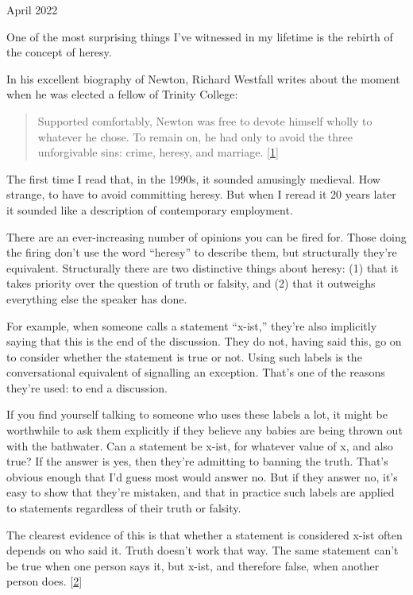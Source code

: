 April 2022

One of the most surprising things I've witnessed in my lifetime is the
rebirth of the concept of heresy.

In his excellent biography of Newton, Richard Westfall writes about the
moment when he was elected a fellow of Trinity College:

\begin{quote}
Supported comfortably, Newton was free to devote himself wholly to
whatever he chose. To remain on, he had only to avoid the three
unforgivable sins: crime, heresy, and marriage. {[}\hyperref[f1n]{1}{]}
\end{quote}

The first time I read that, in the 1990s, it sounded amusingly medieval.
How strange, to have to avoid committing heresy. But when I reread it 20
years later it sounded like a description of contemporary employment.

There are an ever-increasing number of opinions you can be fired for.
Those doing the firing don't use the word ``heresy'' to describe them,
but structurally they're equivalent. Structurally there are two
distinctive things about heresy: (1) that it takes priority over the
question of truth or falsity, and (2) that it outweighs everything else
the speaker has done.

For example, when someone calls a statement ``x-ist,'' they're also
implicitly saying that this is the end of the discussion. They do not,
having said this, go on to consider whether the statement is true or
not. Using such labels is the conversational equivalent of signalling an
exception. That's one of the reasons they're used: to end a discussion.

If you find yourself talking to someone who uses these labels a lot, it
might be worthwhile to ask them explicitly if they believe any babies
are being thrown out with the bathwater. Can a statement be x-ist, for
whatever value of x, and also true? If the answer is yes, then they're
admitting to banning the truth. That's obvious enough that I'd guess
most would answer no. But if they answer no, it's easy to show that
they're mistaken, and that in practice such labels are applied to
statements regardless of their truth or falsity.

The clearest evidence of this is that whether a statement is considered
x-ist often depends on who said it. Truth doesn't work that way. The
same statement can't be true when one person says it, but x-ist, and
therefore false, when another person does. {[}\hyperref[f2n]{2}{]}

